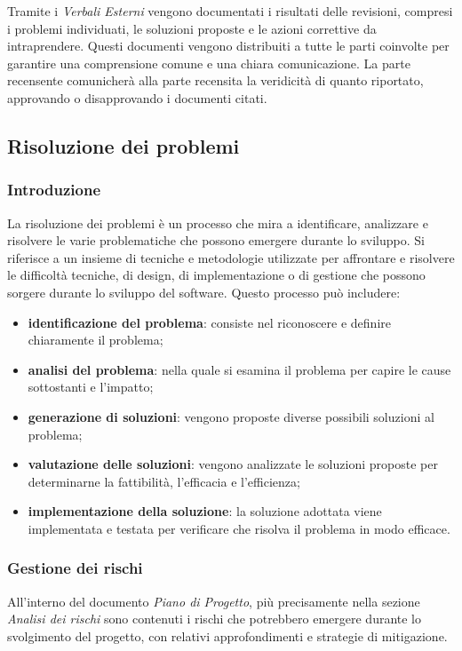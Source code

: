 Tramite i \textit{Verbali Esterni} vengono documentati i risultati delle revisioni, compresi i problemi individuati, le soluzioni proposte e le azioni correttive da intraprendere. Questi documenti vengono distribuiti a tutte le parti coinvolte per garantire una comprensione comune e una chiara comunicazione. La parte recensente comunicherà alla parte recensita la veridicità di quanto riportato, approvando o disapprovando i documenti citati.

\subsection{Risoluzione dei problemi}
\subsubsection{Introduzione}
La risoluzione dei problemi è un processo che mira a identificare, analizzare e risolvere le varie problematiche che possono emergere durante lo sviluppo. Si riferisce a un insieme di tecniche e metodologie utilizzate per affrontare e risolvere le difficoltà tecniche, di design, di implementazione o di gestione che possono sorgere durante lo sviluppo del software. Questo processo può includere:
\begin{itemize}
	\item \textbf{identificazione del problema}: consiste nel riconoscere e definire chiaramente il problema;
	\item \textbf{analisi del problema}: nella quale si esamina il problema per capire le cause sottostanti e l'impatto;
	\item \textbf{generazione di soluzioni}: vengono proposte diverse possibili soluzioni al problema;
	\item \textbf{valutazione delle soluzioni}: vengono analizzate le soluzioni proposte per determinarne la fattibilità, l'efficacia e l'efficienza;
	\item \textbf{implementazione della soluzione}: la soluzione adottata viene implementata e testata per verificare che risolva il problema in modo efficace.
\end{itemize}

\subsubsection{Gestione dei rischi}
All'interno del documento \textit{Piano di Progetto}, più precisamente nella sezione \textit{Analisi dei rischi} sono contenuti i rischi che potrebbero emergere durante lo svolgimento del progetto, con relativi approfondimenti e strategie di mitigazione.

